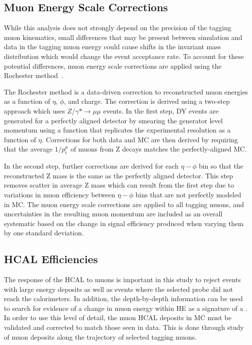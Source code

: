 \subsection{Muon Energy Scale Corrections}
While this analysis does not strongly depend on the precision of the tagging muon kinematics, small differences that may be present between simulation and data in the tagging muon energy could cause shifts in the invariant mass distribution which would change the event acceptance rate.
To account for these potential differences, muon energy scale corrections are applied using the Rochester method~\cite{rochester_corr}.

The Rochester method is a data-driven correction to reconstructed muon energies as a function of $\eta$, $\phi$, and charge.
The correction is derived using a two-step approach which uses $Z/\gamma* \rightarrow \mu\mu$ events.
In the first step, DY events are generated for a perfectly aligned detector by smearing the generator level momentum using a function that replicates the experimental resolution as a function of $\eta$. 
Corrections for both data and MC are then derived by requiring that the average $1/p_t^\mu$ of muons from Z decays matches the perfectly-aligned MC.

In the second step, further corrections are derived for each $\eta-\phi$ bin so that the reconstructed Z mass is the same as the perfectly aligned detector. 
This step removes scatter in average Z mass which can result from the first step due to variations in muon efficiency between $\eta-\phi$ bins that are not perfectly modeled in MC. 
The muon energy scale corrections are applied to all tagging muons, and uncertainties in the resulting muon momentum are included as an overall systematic based on the change in signal efficiency produced when varying them by one standard deviation.

\subsection{HCAL Efficiencies}
\label{sec:HCALeff}
The response of the HCAL to muons is important in this study to reject events with large energy deposits as well as events where the selected probe did not reach the calorimeters.
In addition, the depth-by-depth information can be used to search for evidence of a change in muon energy within HE as a signature of a \dbrem.
In order to use this level of detail, the muon HCAL deposits in MC must be validated and corrected to match those seen in data.
This is done through study of muon deposits along the trajectory of selected tagging muons.

